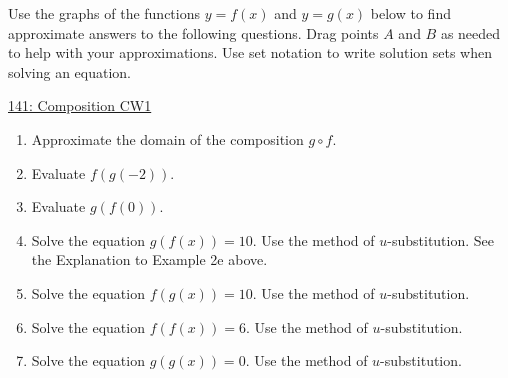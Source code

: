 \documentclass{ximera}
\begin{document}
\begin{example}  \label{Erer6t364}
Use the graphs of the functions $y=f(x)$ and $y=g(x)$ below to find approximate answers to the following questions. Drag points $A$ and $B$ as needed to help with your approximations. Use set notation to write solution sets when solving an equation.

\begin{onlineOnly}
    \begin{center}
\end{center}
\end{onlineOnly}

\href{https://www.desmos.com/calculator/githr11qtb}{141: Composition CW1}

\begin{enumerate}

\item Approximate the domain of the composition $g\circ f$.

\item Evaluate $f(g(-2))$.

\item Evaluate $g(f(0))$.

\item Solve the equation $g(f(x))=10$. Use the method of $u$-substitution. See the Explanation to Example 2e above.

\item Solve the equation $f(g(x)) = 10$. Use the method of $u$-substitution.

\item Solve the equation $f(f(x)) = 6$. Use the method of $u$-substitution.

\item Solve the equation $g(g(x)) = 0$. Use the method of $u$-substitution.
\end{enumerate}
\end{example}
\end{document}
